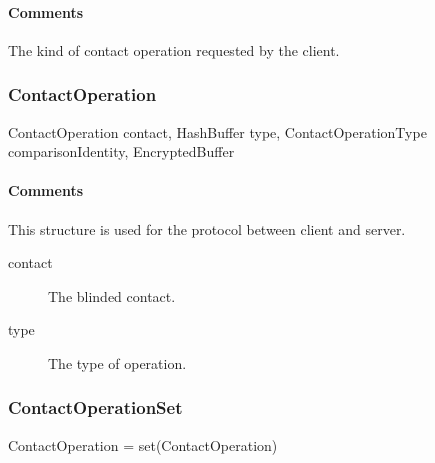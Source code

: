 \documentclass[a4paper,10pt]{article}
\begin{document}
\begin{inparaitem}[ ]
 \item \infrastructure
\end{inparaitem}

\paragraph*{Comments}
The kind of contact operation requested by the client.

\subsubsection{ContactOperation}

\begin{verbbox}
ContactOperation
{
  contact, HashBuffer
  type, ContactOperationType
  comparisonIdentity, EncryptedBuffer
}
\end{verbbox}
\begin{center}
\theverbbox
\end{center}

\begin{inparaitem}[ ]
 \item \infrastructure
\end{inparaitem}

\SpecialItem\paragraph*{Comments}
This structure is used for the protocol between client and server.

\begin{description}
 \item[contact] The blinded contact.
 \item[type] The type of operation.
\end{description}

\subsubsection{ContactOperationSet}

\begin{verbbox}
ContactOperation = set(ContactOperation)
\end{verbbox}
\begin{center}
\theverbbox
\end{center}

\begin{inparaitem}[ ]
 \item \unsecure
\end{inparaitem}
\end{document}
